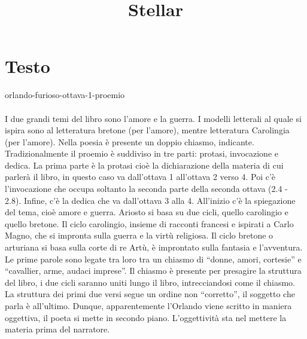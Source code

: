 \documentclass[preview]{standalone}
\begin{document}
\title{Stellar}
\genpage

\section{Testo}


\begin{snippet}{orlando-furioso-ottava-1-proemio}
    \\\\
    I due grandi temi del libro sono l'amore e la guerra.
    I modelli letterali al quale si ispira sono al letteratura bretone (per l'amore),
    mentre letteratura Carolingia (per l'amore).
    Nella poesia è presente un doppio chiasmo, indicante.
    Tradizionalmente il proemio è suddiviso in tre parti: protasi, invocazione e dedica.
    La prima parte è la protasi cioè la dichiarazione della materia di
    cui parlerà il libro, in questo caso va dall'ottava 1 all'ottava 2 verso 4.
    Poi c'è l'invocazione che occupa soltanto la seconda parte della seconda ottava
    (2.4 - 2.8). Infine, c'è la dedica che va dall'ottava 3 alla 4.
    All'inizio c'è la spiegazione del tema, cioè amore e guerra.
    Ariosto si basa su due cicli, quello carolingio e quello bretone.
    Il ciclo carolingio, insieme di racconti francesi e ispirati a Carlo Magno,
    che si impronta sulla guerra e la virtù religiosa.
    Il ciclo bretone o arturiana si basa sulla corte di re Artù,
    è improntato sulla fantasia e l'avventura. Le prime parole sono legate
    tra loro tra un chiasmo di “donne, amori, cortesie” e “cavallier, arme,
    audaci imprese”. Il chiasmo è presente per presagire la struttura del libro,
    i due cicli saranno uniti lungo il libro, intrecciandosi come il chiasmo. 
    La struttura dei primi due versi segue un ordine non “corretto”,
    il soggetto che parla è all'ultimo.
    Dunque, apparentemente l'Orlando viene scritto in maniera oggettiva,
    il poeta si mette in secondo piano.
    L'oggettività sta nel mettere la materia prima del narratore.
\end{snippet}
\end{document}
